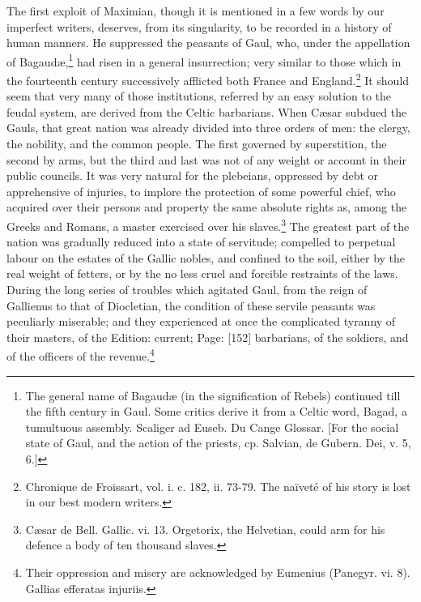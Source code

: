 The first exploit of Maximian, though it is mentioned in a few words by our imperfect writers, deserves, from its singularity, to be recorded in a history of human manners. He suppressed the peasants of Gaul, who, under the appellation of Bagaudæ,\footnote{The general name of Bagaudæ (in the signification of Rebels) continued till the fifth century in Gaul. Some critics derive it from a Celtic word, Bagad, a tumultuous assembly. Scaliger ad Euseb. Du Cange Glossar. [For the social state of Gaul, and the action of the priests, cp. Salvian, de Gubern. Dei, v. 5, 6.]} had risen in a general insurrection; very similar to those which in the fourteenth century successively afflicted both France and England.\footnote{Chronique de Froissart, vol. i. c. 182, ii. 73-79. The naïveté of his story is lost in our best modern writers.} It should seem that very many of those institutions, referred by an easy solution to the feudal system, are derived from the Celtic barbarians. When Cæsar subdued the Gauls, that great nation was already divided into three orders of men: the clergy, the nobility, and the common people. The first governed by superstition, the second by arms, but the third and last was not of any weight or account in their public councils. It was very natural for the plebeians, oppressed by debt or apprehensive of injuries, to implore the protection of some powerful chief, who acquired over their persons and property the same absolute rights as, among the Greeks and Romans, a master exercised over his slaves.\footnote{Cæsar de Bell. Gallic. vi. 13. Orgetorix, the Helvetian, could arm for his defence a body of ten thousand slaves.} The greatest part of the nation was gradually reduced into a state of servitude; compelled to perpetual labour on the estates of the Gallic nobles, and confined to the soil, either by the real weight of fetters, or by the no less cruel and forcible restraints of the laws. During the long series of troubles which agitated Gaul, from the reign of Gallienus to that of Diocletian, the condition of these servile peasants was peculiarly miserable; and they experienced at once the complicated tyranny of their masters, of the Edition: current; Page: [152] barbarians, of the soldiers, and of the officers of the revenue.\footnote{Their oppression and misery are acknowledged by Eumenius (Panegyr. vi. 8). Gallias efferatas injuriis.}

